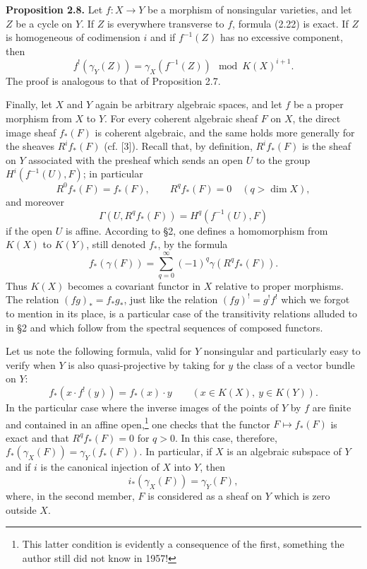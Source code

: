 \textbf{Proposition 2.8.} Let $f:X\to Y$ be a morphism of nonsingular varieties, and let $Z$ be a cycle on $Y$. If $Z$ is everywhere transverse to $f$, formula (2.22) is exact. If $Z$ is homogeneous of codimension $i$ and if $f^{-1}(Z)$ has no excessive component, then
\begin{equation}\tag{2.23}
 f^!(\gamma_Y(Z))=\gamma_X(f^{-1}(Z))\mod K(X)^{i+1}.
\end{equation}
The proof is analogous to that of Proposition 2.7.

Finally, let $X$ and $Y$ again be arbitrary algebraic spaces, and let $f$ be a proper morphism from $X$ to $Y$. For every coherent algebraic sheaf $F$ on $X$, the direct image sheaf $f_*(F)$ is coherent algebraic, and the same holds more generally for the sheaves $R^if_*(F)$ (cf. [3]). Recall that, by definition, $R^if_*(F)$ is the sheaf on $Y$ associated with the presheaf which sends an open $U$ to the group $H^i(f^{-1}(U),F)$; in particular
\begin{equation}\tag{2.24}
 R^0f_*(F)=f_*(F),\qquad R^qf_*(F)=0\quad(q>\dim X),
\end{equation}
and moreover
\begin{equation}\tag{2.25}
 \Gamma(U,R^qf_*(F))=H^q(f^{-1}(U),F)
\end{equation}
if the open $U$ is affine. According to \S 2, one defines a homomorphism from $K(X)$ to $K(Y)$, still denoted $f_*$, by the formula
\begin{equation}\tag{2.26}
 f_*(\gamma(F))=\sum_{q=0}^{\infty}(-1)^q\gamma(R^qf_*(F)).
\end{equation}
Thus $K(X)$ becomes a covariant functor in $X$ relative to proper morphisms. The relation $(fg)_*=f_*g_*$, just like the relation $(fg)^!=g^!f^!$ which we forgot to mention in its place, is a particular case of the transitivity relations alluded to in \S 2 and which follow from the spectral sequences of composed functors.

Let us note the following formula, valid for $Y$ nonsingular and particularly easy to verify when $Y$ is also quasi-projective by taking for $y$ the class of a vector bundle on $Y$:
\begin{equation}\tag{2.27}
 f_*(x\cdot f^!(y))=f_*(x)\cdot y\qquad (x\in K(X),\ y\in K(Y)).
\end{equation}
In the particular case where the inverse images of the points of $Y$ by $f$ are finite and contained in an affine open,\footnote{This latter condition is evidently a consequence of the first, something the author still did not know in 1957!} one checks that the functor $F\mapsto f_*(F)$ is exact and that $R^qf_*(F)=0$ for $q>0$. In this case, therefore, $f_*(\gamma_X(F))=\gamma_Y(f_*(F))$. In particular, if $X$ is an algebraic subspace of $Y$ and if $i$ is the canonical injection of $X$ into $Y$, then
\begin{equation}\tag{2.28}
 i_*(\gamma_X(F))=\gamma_Y(F),
\end{equation}
where, in the second member, $F$ is considered as a sheaf on $Y$ which is zero outside $X$.

